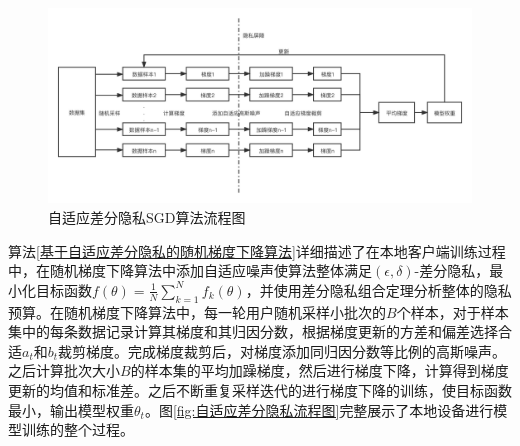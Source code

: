 \begin{figure}[!hbt]
\centering
	\includegraphics[scale=0.3]{fig2/C3/自适应差分隐私流程图}%
	\caption{自适应差分隐私SGD算法流程图}
	\label{fig:自适应差分隐私SGD算法流程图}	
\end{figure}

算法\ref{基于自适应差分隐私的随机梯度下降算法}详细描述了在本地客户端训练过程中，在随机梯度下降算法中添加自适应噪声使算法整体满足$(\epsilon, \delta)$-差分隐私，最小化目标函数$f(\theta)=\frac{1}{N} \sum_{k=1}^{N} f_{k}(\theta)$，并使用差分隐私组合定理分析整体的隐私预算。在随机梯度下降算法中，每一轮用户随机采样小批次的$B$个样本，对于样本集中的每条数据记录计算其梯度和其归因分数，根据梯度更新的方差和偏差选择合适$a_{t}$和$b_{t}$裁剪梯度。完成梯度裁剪后，对梯度添加同归因分数等比例的高斯噪声。之后计算批次大小$B$的样本集的平均加躁梯度，然后进行梯度下降，计算得到梯度更新的均值和标准差。之后不断重复采样迭代的进行梯度下降的训练，使目标函数最小，输出模型权重$\theta_{t}$。图\ref{fig:自适应差分隐私流程图}完整展示了本地设备进行模型训练的整个过程。

